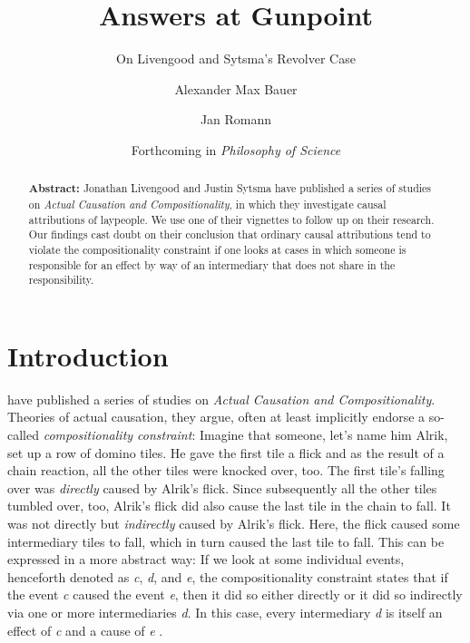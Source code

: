 \documentclass[12pt]{scrartcl}
\title{Answers at Gunpoint}
\subtitle{On Livengood and Sytsma's Revolver Case}
\author[1]{Alexander Max Bauer}
\author[2]{Jan Romann}
\affil[1]{ Department of Philosophy, University of Oldenburg,

Corresponding Author, E-Mail: \href{mailto:alexander.max.bauer@uni-oldenburg.de}{alexander.max.bauer@uni-oldenburg.de}}
\affil[2]{ SOCIUM Research Center on Inequality and Social Policy, University of Bremen}
\date{\small Forthcoming in \textit{Philosophy of Science}}
\begin{document}
\maketitle

\begin{abstract}
   \noindent\textbf{\textsf{Abstract:}} Jonathan Livengood and Justin Sytsma have published a series of studies on \textit{Actual Causation and Compositionality}, in which they investigate causal attributions of laypeople. We use one of their vignettes to follow up on their research. Our findings cast doubt on their conclusion that ordinary causal attributions tend to violate the compositionality constraint if one looks at cases in which someone is responsible for an effect by way of an intermediary that does not share in the responsibility.
\end{abstract}

\section{Introduction}
\citet*{livengood_actual_2020} have published a series of studies on \textit{Actual Causation and Compositionality}. Theories of actual causation, they argue, often at least implicitly endorse a so-called \textit{compositionality constraint}: Imagine that someone, let's name him Alrik, set up a row of domino tiles. He gave the first tile a flick and as the result of a chain reaction, all the other tiles were knocked over, too. The first tile's falling over was \textit{directly} caused by Alrik's flick. Since subsequently all the other tiles tumbled over, too, Alrik's flick did also cause the last tile in the chain to fall. It was not directly but \textit{indirectly} caused by Alrik's flick. Here, the flick caused some intermediary tiles to fall, which in turn caused the last tile to fall. This can be expressed in a more abstract way: If we look at some individual events, henceforth denoted as \textit{c}, \textit{d}, and \textit{e}, the compositionality constraint states that if the event \textit{c} caused the event \textit{e}, then it did so either directly or it did so indirectly via one or more intermediaries \textit{d}. In this case, every intermediary \textit{d} is itself an effect of \textit{c} and a cause of \textit{e} \citep[44]{livengood_actual_2020}.
\end{document}
